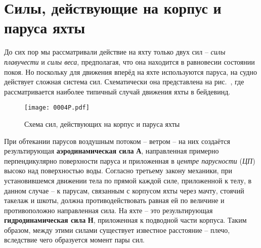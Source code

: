 \section{Силы, действующие на корпус и паруса яхты}

До сих пор мы рассматривали действие на яхту только двух сил \--- \textit{силы
плавучести} и \textit{силы веса},
предполагая, что она находится в равновесии состоянии покоя. Но
поскольку для движения вперёд на яхте используются паруса, на судно
действует сложная система сил. Схематически она представлена на
рис.~, где рассматривается наиболее типичный случай движения
яхты в бейдевинд.

\begin{figure*}[htb]
  \centering
  \texttt{[image: 0004P.pdf]}
  \caption{Схема сил, действующих на корпус и паруса яхты}
  \label{fig:4}
\end{figure*}

При обтекании парусов воздушным потоком \--- ветром \--- на них
создаётся результирующая \textbf{аэродинамическая
  сила} \textbf{А}, направленная примерно
перпендикулярно поверхности паруса и приложенная в \textit{центре парусности}
(\textit{ЦП}) высоко над поверхностью
воды. Согласно третьему закону механики, при установившемся движении
тела по прямой каждой силе, приложенной к телу, в данном случае \--- к
парусам, связанным с корпусом яхты через мачту, стоячий такелаж и
шкоты, должна противодействовать равная ей по величине и
противоположно направленная сила. На яхте \--- это результирующая
\textbf{гидродинамическая сила}
\textbf{Н}, приложенная к подводной части корпуса. Таким образом,
между этими силами существует известное расстояние \--- плечо,
вследствие чего образуется момент пары сил.


